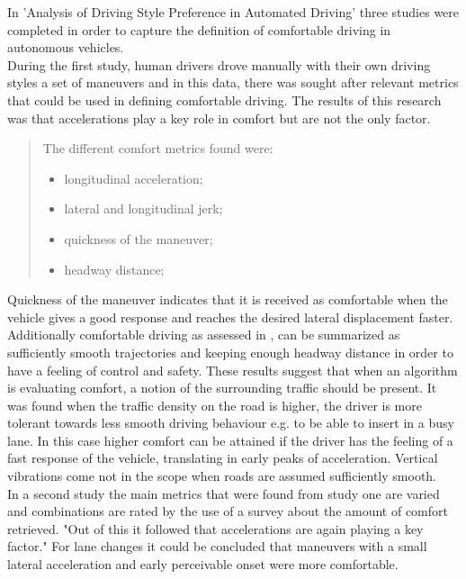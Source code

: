 In 'Analysis of Driving Style Preference in Automated Driving' \cite{Bellem} three studies were completed in order to capture the definition of comfortable driving in autonomous vehicles.\\
During the first study, human drivers drove manually with their own driving styles a set of maneuvers and in this data, there was sought after relevant metrics that could be used in defining comfortable driving. The results of this research was that accelerations play a key role in comfort but are not the only factor. \cite{Bellem}\\

\begin{quote}
	The different comfort metrics found were:
	\begin{itemize}
		\item longitudinal acceleration;
		\item lateral and longitudinal jerk;
		\item quickness of the maneuver;
		\item headway distance;
	\end{itemize}
\end{quote}

Quickness of the maneuver indicates that it is received as comfortable when the vehicle gives a good response and reaches the desired lateral displacement faster.
Additionally comfortable driving as assessed in \cite{Bellem}, can be summarized as  sufficiently smooth trajectories and keeping enough headway distance in order to have a feeling of control and safety. These results suggest that when an algorithm is evaluating comfort, a notion of the surrounding traffic should be present. It was found when the traffic density on the road is higher, the driver is more tolerant towards less smooth driving behaviour e.g. to be able to insert in a busy lane. In this case higher comfort can be attained if the driver has the feeling of a fast response of the vehicle, translating in early peaks of acceleration. Vertical vibrations come not in the scope when roads are assumed sufficiently smooth.\\

In a second study the main metrics that were found from study one are varied and combinations are rated by the use of a survey about the amount of comfort retrieved. "Out of this it followed that accelerations are again playing a key factor." \cite{Bellem} For lane changes it could be concluded that maneuvers with a small lateral acceleration and early perceivable onset were more comfortable.\\

